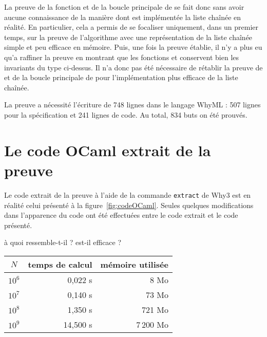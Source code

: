 \documentclass[a4paper]{easychair}
\begin{document}
La preuve de la fonction  et de la boucle
principale de  se fait donc sans avoir aucune connaissance
de la manière dont est implémentée la liste chaînée en réalité.
En particulier, cela a permis de se focaliser uniquement, dans un premier temps,
sur la preuve de l'algorithme avec une représentation de la liste chaînée
simple et peu efficace en mémoire.
Puis, une fois la preuve établie, il n'y a plus eu qu'a raffiner la preuve en
montrant que les fonctions  et  conservent bien les
invariants du type ci-dessus.
Il n'a donc pas été nécessaire de rétablir la preuve de  et
de la boucle principale de  pour l'implémentation
plus efficace de la liste chaînée.


La preuve a nécessité l'écriture de 748 lignes dans le langage WhyML :
507 lignes pour la spécification et 241 lignes de code.
Au total, 834 buts on été prouvés.



\section{Le code OCaml extrait de la preuve}
\label{sec:extraction}

Le code extrait de la preuve à l'aide de la commande \texttt{extract} de Why3
est en réalité celui présenté à la figure~\ref{fig:codeOCaml}.
Seules quelques modifications dans l'apparence du code ont été effectuées
entre le code extrait et le code présenté.

à quoi ressemble-t-il ?
est-il efficace ?

\begin{center}
  \begin{tabular}{|c|r|r|}
    \hline
    $N$ & temps de calcul & mémoire utilisée \\
    \hline\hline
    $10^6$ &  0,022 s &      8 Mo \\\hline
    $10^7$ &  0,140 s &     73 Mo \\\hline
    $10^8$ &  1,350 s &    721 Mo \\\hline
    $10^9$ & 14,500 s & 7\,200 Mo \\\hline
  \end{tabular}
\end{center}
\end{document}
